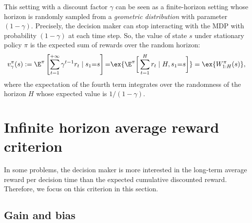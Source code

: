 This setting with a discount factor $\gamma$ can be seen as a finite-horizon setting whose horizon is randomly sampled from a \emph{geometric distribution} with parameter $(1-\gamma)$.
Precisely, the decision maker can stop interacting with the MDP with probability $(1-\gamma)$ at each time step.
So, the value of state $s$ under stationary policy $\pi$ is the expected sum of rewards over the random horizon:
\begin{equation}
    \label{eq:discount_finite}
    v^\pi_\gamma(s) :=\E^\pi\left[\sum_{t=1}^{+\infty} \gamma^{t-1}r_t \mid s_1{=}s\right] {=}\ex{\E^\pi\bigg[\sum_{t=1}^H r_t\mid H, s_1{=}s\bigg]} =\ex{W^\pi_{1:H}(s)},
\end{equation}
where the expectation of the fourth term integrates over the randomness of the horizon $H$ whose expected value is $1/(1-\gamma)$.

\section{Infinite horizon average reward criterion}
\label{ch:mdp:sec:gain}

In some problems, the decision maker is more interested in the long-term average reward per decision time than the expected cumulative discounted reward.
Therefore, we focus on this criterion in this section.

\subsection{Gain and bias}

